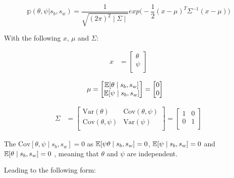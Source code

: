 \documentclass[a4paper,11pt]{article}
\theoremstyle{mytheor}
\newcommand{\E}{\Bbb{E}}
\newcommand{\Var}{\mathrm{Var}}
\newcommand{\Cov}{\mathrm{Cov}}
\begin{document}
\begin{equation}
    \label{p_psi_theta}
    \mathbb{p}(\theta,\psi|s_b,s_w)= \frac{1}{\sqrt{(2\pi)^2\mid\Sigma\mid}}exp \Bigg( -\frac{1}{2}(x-\mu)^T\Sigma^{-1}(x-\mu) \Bigg)
\end{equation}

With the following $x$, $\mu$ and $\Sigma$:

\begin{align}
    \label{vec_theta_psi}
    x &= \begin{bmatrix}
           \theta \\
           \psi \\
         \end{bmatrix}
\end{align}

\begin{align}
    \label{vec_theta_psi_mean}
    \mu &= \begin{bmatrix}
           \E[\theta \mid s_b,s_w] \\
           \E[\psi \mid s_b,s_w] \\
         \end{bmatrix} = \begin{bmatrix}
                            0 \\
                            0 \\
                          \end{bmatrix}
\end{align}

\begin{align}
    \label{vec_theta_psi_cov_mat}
    \Sigma &= \begin{bmatrix}
           \Var(\theta) & \Cov(\theta,\psi)\\
           \Cov(\theta,\psi) & \Var(\psi) \\
         \end{bmatrix} = \begin{bmatrix}
                            1 & 0 \\
                            0 & 1 \\
                          \end{bmatrix}
\end{align}

The $\Cov[\theta,\psi \mid s_b,s_w]=0$ as $\E[\psi\theta \mid s_b,s_w]=0$, $\E[\psi \mid s_b,s_w]=0$ and $\E[\theta \mid s_b,s_w]=0$ , meaning that $\theta$ and $\psi$ are independent.

Leading to the following form:
  
\end{document}

